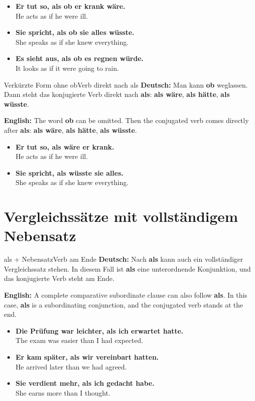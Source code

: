 \documentclass[a4paper,11pt]{article}
\newcommand{\GermanText}[1]{\textbf{Deutsch: }#1\par}
\newcommand{\EnglishText}[1]{{\small\color{SoftGray}\textbf{English: }#1\par}}
\newcommand{\ExampleItem}[2]{\item \textbf{#1}\\{\small\color{SoftGray}#2}}
\begin{document}
        \begin{exbox}
            \begin{itemize}
                \ExampleItem{Er tut so, als ob er krank wäre.}{He acts as if he were ill.}
                \ExampleItem{Sie spricht, als ob sie alles wüsste.}{She speaks as if she knew everything.}
                \ExampleItem{Es sieht aus, als ob es regnen würde.}{It looks as if it were going to rain.}
            \end{itemize}
        \end{exbox}

        \begin{grammarentry}{Verkürzte Form ohne \glqq ob\grqq}{Verb direkt nach als}
            \GermanText{Man kann \textbf{ob} weglassen. Dann steht das konjugierte Verb direkt nach \textbf{als}: \textbf{als wäre}, \textbf{als hätte}, \textbf{als wüsste}.}
            \EnglishText{The word \textbf{ob} can be omitted. Then the conjugated verb comes directly after \textbf{als}: \textbf{als wäre}, \textbf{als hätte}, \textbf{als wüsste}.}
        \end{grammarentry}

        \begin{exbox}
            \begin{itemize}
                \ExampleItem{Er tut so, als wäre er krank.}{He acts as if he were ill.}
                \ExampleItem{Sie spricht, als wüsste sie alles.}{She speaks as if she knew everything.}
            \end{itemize}
        \end{exbox}

    \section{Vergleichssätze mit vollständigem Nebensatz}

        \begin{grammarentry}{als + Nebensatz}{Verb am Ende}
            \GermanText{Nach \textbf{als} kann auch ein vollständiger Vergleichssatz stehen. In diesem Fall ist \textbf{als} eine unterordnende Konjunktion, und das konjugierte Verb steht am Ende.}
            \EnglishText{A complete comparative subordinate clause can also follow \textbf{als}. In this case, \textbf{als} is a subordinating conjunction, and the conjugated verb stands at the end.}
        \end{grammarentry}

        \begin{exbox}
            \begin{itemize}
                \ExampleItem{Die Prüfung war leichter, als ich erwartet hatte.}{The exam was easier than I had expected.}
                \ExampleItem{Er kam später, als wir vereinbart hatten.}{He arrived later than we had agreed.}
                \ExampleItem{Sie verdient mehr, als ich gedacht habe.}{She earns more than I thought.}
            \end{itemize}
        \end{exbox}
\end{document}
